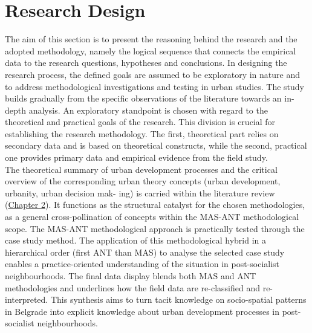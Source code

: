 \documentclass[11pt]{report}
\begin{document}

\section{Research Design}

The aim of this section is to present the reasoning behind the research and the adopted methodology, namely the logical sequence that connects the empirical data to the research questions, hypotheses and conclusions. In designing the research process, the defined goals are assumed to be exploratory in nature and to address methodological investigations and testing in urban studies. The study builds gradually from the specific observations of the literature towards an in-depth analysis. An exploratory standpoint is chosen with regard to the theoretical and practical goals of the research. This division is crucial for establishing the research methodology. The first, theoretical part relies on secondary data and is based on theoretical constructs, while the second, practical one provides primary data and empirical evidence from the field study.
\\

The theoretical summary of urban development processes and the critical overview of the corresponding urban theory concepts (urban development, urbanity, urban decision mak- ing) is carried within the literature review  (\href{Chapter 2}{Chapter 2}). It functions as the structural catalyst for the chosen methodologies, as a general cross-pollination of concepts within the MAS-ANT methodological scope. The MAS-ANT methodological approach is practically tested through the case study method. The application of this methodological hybrid in a hierarchical order (first ANT than MAS) to analyse the selected case study enables a practice-oriented understanding of the situation in post-socialist neighbourhoods. The final data display blends both MAS and ANT methodologies and underlines how the field data are re-classified and re-interpreted. This synthesis aims to turn tacit knowledge on socio-spatial patterns in Belgrade into explicit knowledge about urban development processes in post-socialist neighbourhoods.
\\
\end{document}
